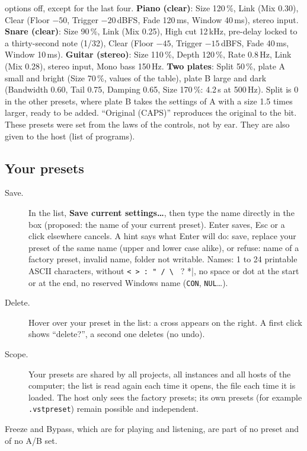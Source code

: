 \documentclass[a4paper,11pt]{article}
\newcommand{\ctl}[1]{\textsf{\textbf{#1}}}   %
\newcommand{\dBFS}{\,dBFS}
\begin{document}
options off, except for the last four. \textbf{Piano (clear)}: Size 120\,\%, Link (Mix 0.30),
Clear (Floor $-50$, Trigger $-20$\dBFS, Fade 120\,ms, Window 40\,ms), stereo input.
\textbf{Snare (clear)}: Size 90\,\%, Link (Mix 0.25), High cut 12\,kHz, pre-delay locked to a
thirty-second note (1/32), Clear (Floor $-45$, Trigger $-15$\dBFS, Fade 40\,ms, Window 10\,ms).
\textbf{Guitar (stereo)}: Size 110\,\%, Depth 120\,\%, Rate 0.8\,Hz, Link (Mix 0.28), stereo
input, Mono bass 150\,Hz. \textbf{Two plates}: Split 50\,\%, plate A small and bright (Size
70\,\%, values of the table), plate B large and dark (Bandwidth 0.60, Tail 0.75, Damping 0.65,
Size 170\,\%: 4.2\,s at 500\,Hz). Split is 0 in the other presets, where plate B takes the
settings of A with a size 1.5 times larger, ready to be added. ``Original (CAPS)'' reproduces the original to the bit. These
presets were set from the laws of the controls, not by ear. They are also given to the host
(list of programs).

\subsection{Your presets}
\begin{description}
\item[Save.] In the list, \ctl{Save current settings\ldots}, then type the name directly in
  the box (proposed: the name of your current preset). \textsf{Enter} saves, \textsf{Esc} or a
  click elsewhere cancels. A hint says what \textsf{Enter} will do: save, replace your preset of
  the same name (upper and lower case alike), or refuse: name of a factory preset, invalid name,
  folder not writable. Names: 1 to 24 printable ASCII characters, without
  \verb|< > : " / \ | ? *|, no space or dot at the start or at the end, no reserved Windows name
  (\texttt{CON}, \texttt{NUL}\ldots).
\item[Delete.] Hover over your preset in the list: a cross appears on the right. A first click
  shows ``delete?'', a second one deletes (no undo).
\item[Scope.] Your presets are shared by all projects, all instances and all hosts of the
  computer; the list is read again each time it opens, the file each time it is loaded. The host
  only sees the factory presets; its own presets (for example \texttt{.vstpreset}) remain
  possible and independent.
\end{description}
Freeze and Bypass, which are for playing and listening, are part of no preset and of no A/B
set.
\end{document}
